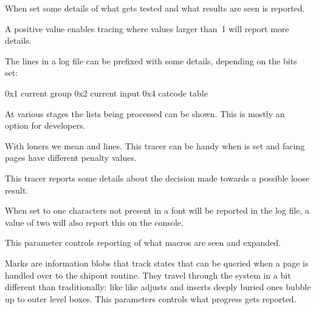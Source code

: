 When set some details of what gets tested and what results are seen is reported.

\stopoldprimitive

\startnewprimitive[title={\prm {tracinginserts}}]

A positive value enables tracing where values larger than~1 will report more
details.

\stopnewprimitive

\startnewprimitive[title={\prm {tracinglevels}}]

The lines in a log file can be prefixed with some details, depending on the bits
set:

\starttabulate[|T|l|]
\NC 0x1 \NC current group \NC \NR
\NC 0x2 \NC current input \NC \NR
\NC 0x4 \NC catcode table \NC \NR
\stoptabulate

\stopnewprimitive

\startnewprimitive[title={\prm {tracinglists}}]

At various stages the lists being processed can be shown. This is mostly an
option for developers.

\stopnewprimitive

\startnewprimitive[title={\prm {tracingloners}}]

With loners we mean  and  lines. This tracer can be
handy when  is set and facing pages have different
penalty values.

\stopnewprimitive

\startnewprimitive[title={\prm {tracinglooseness}}]

This tracer reports some details about the decision made towards a possible
loose result.

\stopnewprimitive

\startoldprimitive[title={\prm {tracinglostchars}}]

When set to one characters not present in a font will be reported in the log
file, a value of two will also report this on the console.

\stopoldprimitive

\startoldprimitive[title={\prm {tracingmacros}}]

This parameter controls reporting of what macros are seen and expanded.

\stopoldprimitive

\startnewprimitive[title={\prm {tracingmarks}}]

Marks are information blobs that track states that can be queried when a page is
handled over to the shipout routine. They travel through the system in a bit
different than traditionally: like like adjusts and inserts deeply buried ones
bubble up to outer level boxes. This parameters controls what progress gets
reported.

